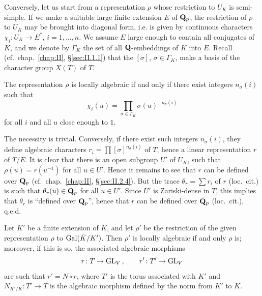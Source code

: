 Conversely, let us start from a representation $\rho$ whose restriction
to $U_K$ is semi-simple.  If we make a suitable large finite extension
$E$ of $\mathbf{Q}_p$, the restriction of $\rho$ to $U_K$ may be brought into
diagonal form, i.e. is given by continuous characters
$\chi_i\colon U_K \to E^*$, $i = 1, \ldots, n$.  We assume $E$ large
enough to contain all conjugates of $K$, and we denote by $\Gamma_K$
the set of all $\mathbf{Q}$-embeddings of $K$ into $E$.  Recall
(cf.~chap.~\ref{chap:II}, \S\ref{sec:II.1.1}) that the $[\sigma]$,
$\sigma \in \Gamma_K$, make a basis of the character group $X(T)$ of
$T$.

\begin{proposition}[2]\label{prop:III.1.1.2}
The representation $\rho$ is locally algebraic if and only if there
exist integers $n_\sigma(i)$ such that
\[
\chi_i(u) = \prod_{\sigma \in \Gamma_K} \sigma(u)^{-n_\sigma(i)}
\]
for all $i$ and all $u$ close enough to $1$.
\end{proposition}

The necessity is trivial.  Conversely, if there exist such integers
$n_\sigma(i)$, they define algebraic characters
$r_i = \prod [\sigma]^{n_\sigma(i)}$ of $T$, hence a linear
representation $r$ of $T/E$.  It is clear that there is an open
subgroup $U'$ of $U_K$, such that $\rho(u) = r(u^{-1})$ for all
$u \in U'$.  Hence it remains to see that $r$ can be defined over
$\mathbf{Q}_p$ (cf.~chap.~\ref{chap:II}, \S\ref{sec:II.2.4}).  But the trace
$\theta_r = \sum r_i$ of $r$ (loc.~cit.) is such that
$\theta_r(u) \in \mathbf{Q}_p$ for all $u \in U'$.  Since $U'$ is
Zariski-dense in $T$, this implies that $\theta_r$ is ``defined over
$\mathbf{Q}_p$'', hence that $r$ can be defined over $\mathbf{Q}_p$ (loc.~cit.),
q.e.d.


Let $K'$ be a finite extension of $K$, and let $\rho'$ be the
restriction of the given representation $\rho$ to $\mathrm{Gal}(\bar K/K')$.
Then $\rho'$ is locally algebraic if and only $\rho$ is; moreover, if
this is so, the associated algebraic morphisms
\[
r\colon T \to \mathrm{GL}_V\,, \qquad r'\colon T' \to \mathrm{GL}_V
\]
are such that $r' = N\circ r$, where $T'$ is the torus associated with
$K'$ and $N_{K'/K}\colon T' \to T$ is the algebraic morphism defined by
the norm from $K'$ to $K$.

